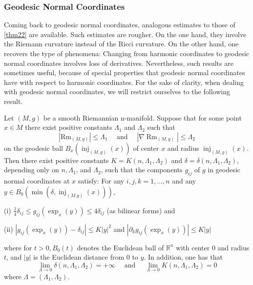 \documentclass[12pt,hyperref,a4paper,UTF8]{ctexart}
\begin{document}
\subsubsection{Geodesic Normal Coordinates}
Coming back to geodesic normal coordinates, analogous estimates to those of \autoref{thm22} are available. Such estimates are rougher. On the one hand, they involve the Riemann curvature instead of the Ricci curvature. On the other hand, one recovers the type of phenomena: Changing from harmonic coordinates to geodesic normal coordinates involves loss of derivatives. Nevertheless, such results are sometimes useful, because of special properties that geodesic normal coordinates have with respect to harmonic coordinates. For the sake of clarity, when dealing with geodesic normal coordinates, we will restrict ourselves to the following result.
\begin{Theorem}
    Let $(M, g)$ be a smooth Riemannian n-manifold. Suppose that for some point $x \in M$ there exist positive constants $\Lambda_1$ and $\Lambda_2$ such that
$$
\left|\mathrm{Rm}_{(M, g)}\right| \leq \Lambda_1 \quad \text { and } \quad\left|\nabla \operatorname{Rm}_{(M, g)}\right| \leq \Lambda_2
$$
on the geodesic ball $B_x\left(\operatorname{inj}_{(M, g)}(x)\right)$ of center $x$ and radius $\operatorname{inj}_{(M, g)}(x)$. Then there exist positive constants $K=K\left(n, \Lambda_1, \Lambda_2\right)$ and $\delta=\delta\left(n, \Lambda_1, \Lambda_2\right)$, depending only on $n, \Lambda_1$, and $\Lambda_2$, such that the components $g_{i j}$ of $g$ in geodesic normal coordinates at $x$ satisfy: For any $i, j, k=1, \ldots, n$ and any $y \in B_0\left(\min \left(\delta, \operatorname{inj}_{(M . g)}(x)\right)\right)$,

\vskip 3pt
(i) $\frac{1}{4} \delta_{i j} \leq g_{i j}\left(\exp _x(y)\right) \leq 4 \delta_{i j}$ (as bilinear forms) and

\vskip 3pt
(ii) $\left|g_{i j}\left(\exp _x(y)\right)-\delta_{i j}\right| \leq K|y|^2$ and $\left|\partial_k g_{i j}\left(\exp _x(y)\right)\right| \leq K|y|$

\vskip 3pt
\noindent
where for $t>0, B_0(t)$ denotes the Euclidean ball of $\mathbb{R}^n$ with center 0 and radius $t$, and $|y|$ is the Euclidean distance from 0 to $y$. In addition, one has that
$$
\lim _{\Lambda \rightarrow 0} \delta\left(n, \Lambda_1, \Lambda_2\right)=+\infty \quad \text { and } \quad \lim _{\Lambda \rightarrow 0} K\left(n, \Lambda_1, \Lambda_2\right)=0
$$
where $\Lambda=\left(\Lambda_1, \Lambda_2\right)$.
\label{thm23}
\end{Theorem}
\end{document}
